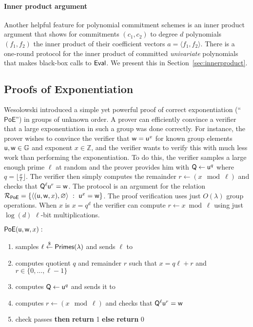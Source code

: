 \paragraph{Inner product argument} Another helpful feature for polynomial commitment schemes is an inner product argument that shows for commitments $(c_1, c_2)$ to degree $d$ polynomials $(f_1, f_2)$ the inner product of their coefficient vectors $a = \langle f_1, f_2 \rangle$. There is a one-round protocol for the inner product of committed \emph{univariate} polynomials that makes black-box calls to $\textsf{{Eval}}$. We present this in Section~\ref{sec:innerproduct}. 

\subsection{Proofs of Exponentiation}
Wesolowski \cite{EC:Wesolowski19} introduced a simple yet powerful proof of correct exponentiation (``$\mathsf{PoE}$'') in groups of unknown order. A prover can efficiently convince a verifier that a large exponentiation in such a group was done correctly. For instance, the prover wishes to convince the verifier that $\mathsf{w} = \mathsf{u}^x$ for known group elements $\mathsf{u}, \mathsf{w} \in \mathbb{G}$ and exponent $x \in \mathbb{Z}$, and the verifier wants to verify this with much less work than performing the exponentiation. To do this, the verifier samples a large enough prime $\ell$ at random and the prover provides him with $\mathsf{Q} \gets \mathsf{u}^q$ where $q = \lfloor \frac{x}{\ell} \rfloor$. The verifier then simply computes the remainder $r \gets (x \mod \ell)$ and checks that $\mathsf{Q}^\ell\mathsf{u}^r = \mathsf{w}$. The protocol is an argument for the relation $\mathcal{R}_\mathsf{PoE} = \left\{ \langle(\mathsf{u}, \mathsf{w}, x), \varnothing\rangle \ : \ \mathsf{u}^x = \mathsf{w} \right\}$. 
The proof verification uses just $O(\lambda)$ group operations. When $x$ is $x=q^d$ the verifier can compute $r\gets x \bmod \ell$ using just $\log(d)$ $\ell$-bit multiplications.
\noindent\begin{mdframed}[userdefinedwidth=\textwidth]
\begin{minipage}{\textwidth}
	\begin{flushleft}
	$\textsf{{PoE}}(\mathsf{u}, \mathsf{w}, x):$
	\begin{enumerate}[nolistsep]
		    \item \verifier samples $\ell \overset{\$}{\gets} \textsf{Primes}(\lambda)$ and sends $\ell$ to \prover
		    \item \prover computes quotient $q$ and remainder $r$ such that $x = q\ell + r$ and $r \in \{0, \ldots, \ell-1\}$
		    \item \prover computes $\mathsf{Q} \gets \mathsf{u}^q$ and sends it to \verifier
		    \item \verifier computes $r \gets (x \mod \ell)$ and checks that $\mathsf{Q}^\ell\mathsf{u}^r = \mathsf{w}$
		    \item \pcif{}check passes \textbf{then} \textbf{return} 1 \textbf{else} \textbf{return} 0
		\end{enumerate}
	\end{flushleft}
\end{minipage}
\end{mdframed}
